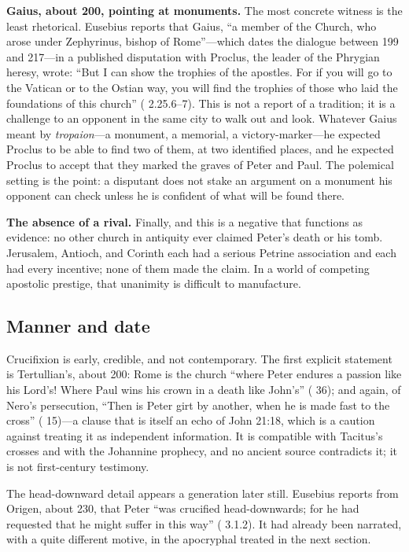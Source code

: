 \textbf{Gaius, about 200, pointing at monuments.} The most concrete witness
is the least rhetorical. Eusebius reports that Gaius, ``a member of the
Church, who arose under Zephyrinus, bishop of Rome''---which dates the
dialogue between 199 and 217---in a published disputation with Proclus, the
leader of the Phrygian heresy, wrote: ``But I can show the trophies of the
apostles. For if you will go to the Vatican or to the Ostian way, you will
find the trophies of those who laid the foundations of this church''
( 2.25.6--7). This is not a report of a tradition; it is
a challenge to an opponent in the same city to walk out and look. Whatever
Gaius meant by \textit{tropaion}---a monument, a memorial, a
victory-marker---he expected Proclus to be able to find two of them, at two
identified places, and he expected Proclus to accept that they marked the
graves of Peter and Paul. The polemical setting is the point: a disputant
does not stake an argument on a monument his opponent can check unless he is
confident of what will be found there.

\textbf{The absence of a rival.} Finally, and this is a negative that
functions as evidence: no other church in antiquity ever claimed Peter's
death or his tomb. Jerusalem, Antioch, and Corinth each had a serious Petrine
association and each had every incentive; none of them made the claim. In a
world of competing apostolic prestige, that unanimity is difficult to
manufacture.

\subsection{Manner and date}

Crucifixion is early, credible, and not contemporary. The first explicit
statement is Tertullian's, about 200: Rome is the church ``where Peter
endures a passion like his Lord's! Where Paul wins his crown in a death like
John's'' ( 36); and again, of Nero's persecution, ``Then
is Peter girt by another, when he is made fast to the cross''
( 15)---a clause that is itself an echo of John 21:18, which
is a caution against treating it as independent information. It is compatible
with Tacitus's crosses and with the Johannine prophecy, and no ancient source
contradicts it; it is not first-century testimony.

The head-downward detail appears a generation later still. Eusebius reports
from Origen, about 230, that Peter ``was crucified head-downwards; for he had
requested that he might suffer in this way'' ( 3.1.2). It
had already been narrated, with a quite different motive, in the apocryphal
 treated in the next section.

